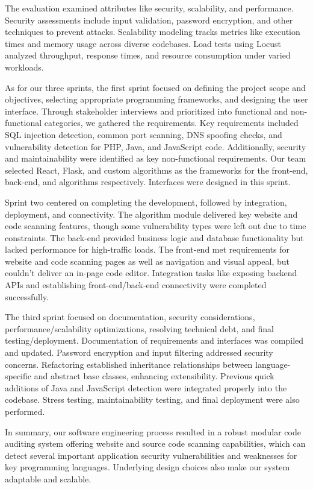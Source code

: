 \documentclass[journal]{IEEEtran}
\begin{document}
The evaluation examined attributes like security, scalability, and performance. Security assessments include input validation, password encryption, and other techniques to prevent attacks. Scalability modeling tracks metrics like execution times and memory usage across diverse codebases. Load tests using Locust analyzed throughput, response times, and resource consumption under varied workloads.

As for our three sprints, the first sprint focused on defining the project scope and objectives, selecting appropriate programming frameworks, and designing the user interface. Through stakeholder interviews and prioritized into functional and non-functional categories, we gathered the requirements. Key requirements included SQL injection detection, common port scanning, DNS spoofing checks, and vulnerability detection for PHP, Java, and JavaScript code. Additionally, security and maintainability were identified as key non-functional requirements. Our team selected React, Flask, and custom algorithms as the frameworks for the front-end, back-end, and algorithms respectively. Interfaces were designed in this sprint. 

Sprint two centered on completing the development, followed by integration, deployment, and connectivity. The algorithm module delivered key website and code scanning features, though some vulnerability types were left out due to time constraints. The back-end provided business logic and database functionality but lacked performance for high-traffic loads. The front-end met requirements for website and code scanning pages as well as navigation and visual appeal, but couldn't deliver an in-page code editor. Integration tasks like exposing backend APIs and establishing front-end/back-end connectivity were completed successfully. 

The third sprint focused on documentation, security considerations, performance/scalability optimizations, resolving technical debt, and final testing/deployment. Documentation of requirements and interfaces was compiled and updated. Password encryption and input filtering addressed security concerns. Refactoring established inheritance relationships between language-specific and abstract base classes, enhancing extensibility. Previous quick additions of Java and JavaScript detection were integrated properly into the codebase. Stress testing, maintainability testing, and final deployment were also performed. 

In summary, our software engineering process resulted in a robust modular code auditing system offering website and source code scanning capabilities, which can detect several important application security vulnerabilities and weaknesses for key programming languages. Underlying design choices also make our system adaptable and scalable.  
\end{document}
